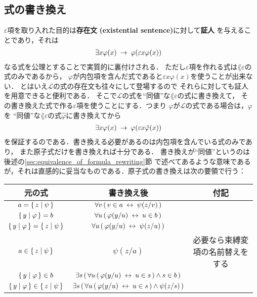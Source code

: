 \subsection{式の書き換え}
	$\varepsilon$項を取り入れた目的は{\bf 存在文}
	{\bf (existential sentence)}に対して{\bf 証人}
	を与えることであり，それは
	\begin{align}
		\exists x \varphi(x) \hspace{0.25em}\rightarrow\hspace{0.25em} \varphi(\varepsilon x \varphi(x))
	\end{align}
	なる式を公理とすることで実質的に裏付けされる．
	ただし$\varepsilon$項を作れる式は$\lang{\varepsilon}$の式のみであるから，
	$\varphi$が内包項を含んだ式であると$\varepsilon x \varphi(x)$を使うことが出来ない．
	とはいえ$\mathcal{L}$の式の存在文も往々にして登場するので
	それらに対しても証人を用意できると便利である．
	そこで$\mathcal{L}$の式を``同値''な$\lang{\varepsilon}$の式に書き換えて，
	その書き換えた式で作る$\varepsilon$項を使うことにする．つまり
	$\varphi$が$\mathcal{L}$の式である場合は，$\varphi$を
	``同値''な$\lang{\varepsilon}$の式$\hat{\varphi}$に書き換えてから
	\begin{align}
		\exists x \varphi(x) \hspace{0.25em}\rightarrow\hspace{0.25em} \varphi(\varepsilon x \hat{\varphi}(x))
	\end{align}
	を保証するのである．書き換える必要があるのは内包項を含んでいる式のみであり，
	また原子式だけを書き換えれば十分である．
	書き換えが``同値''というのは後述の\ref{sec:equivalence_of_formula_rewriting}節
	で述べてあるような意味であるが，それは直感的に妥当なものである．原子式の書き換えは次の要領で行う：
	
	\begin{table}[H]
		\begin{center}
		\begin{tabular}{c|c|c}
			元の式 & 書き換え後 & 付記 \\ \hline \hline
			$a = \{\, z \mid \psi\, \}$ & $\forall v\, (\, v \in a \hspace{0.25em}\leftrightarrow\hspace{0.25em} \psi(z/v)\, )$ & \\ \hline
			$\{\, y \mid \varphi\, \} = b$ & $\forall u\, (\, \varphi(y/u) \hspace{0.25em}\leftrightarrow\hspace{0.25em} u \in b\, )$ & \\ \hline
			$\{\, y \mid \varphi\, \} = \{\, z \mid \psi\, \}$ & $\forall u\, (\, \varphi(y/u) \hspace{0.25em}\leftrightarrow\hspace{0.25em} \psi(z/u)\, )$ & \\ \hline
			$a \in \{\, z \mid \psi\, \}$ & $\psi(z/a)$ & 必要なら束縛変項の名前替えをする\footnotemark \\ \hline
			$\{\, y \mid \varphi\, \} \in b$ & $\exists s\, (\, \forall u\, (\, \varphi(y/u) \hspace{0.25em}\leftrightarrow\hspace{0.25em} u \in s\, ) \wedge s \in b\, )$ & \\ \hline
			$\{\, y \mid \varphi\, \} \in \{\, z \mid \psi\, \}$ & $\exists s\, (\, \forall u\, (\, \varphi(y/u) \hspace{0.25em}\leftrightarrow\hspace{0.25em} u \in s\, ) \wedge \psi(z/s)\, )$ & \\ \hline
		\end{tabular}
		\end{center}
	\end{table}
	
